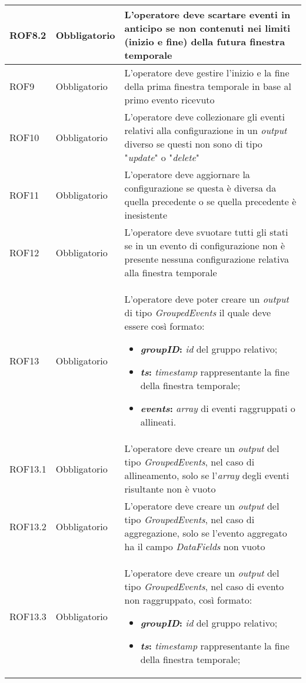 {\begin{longtable}{L{3cm} L{3cm} L{7.5cm}}
\hline
ROF8.2 & Obbligatorio & L'operatore deve scartare eventi in anticipo se non contenuti nei limiti (inizio e fine) della futura finestra temporale\\
\hline
ROF9 & Obbligatorio & L'operatore deve gestire l'inizio e la fine della prima finestra temporale in base al primo evento ricevuto\\
\hline
ROF10 & Obbligatorio & L'operatore deve collezionare gli eventi relativi alla configurazione in un \textit{output} diverso se questi non sono di tipo "\textit{update}" o "\textit{delete}"\\
\hline
ROF11 & Obbligatorio & L'operatore deve aggiornare la configurazione se questa è diversa da quella precedente o se quella precedente è inesistente\\
\hline
ROF12 & Obbligatorio & L'operatore deve svuotare tutti gli stati se in un evento di configurazione non è presente nessuna configurazione relativa alla finestra temporale\\
\hline
ROF13 & Obbligatorio & L'operatore deve poter creare un \textit{output} di tipo \textit{GroupedEvents} il quale deve essere così formato:
\begin{itemize}
	\item{\textbf{\textit{groupID}:} \textit{id} del gruppo relativo;}
	\item{\textbf{\textit{ts}:} \textit{\gls{timestamp}} rappresentante la fine della finestra temporale;}
	\item{\textbf{\textit{events}:} \textit{array} di eventi raggruppati o allineati.}
\end{itemize}\\
\hline
ROF13.1 & Obbligatorio & L'operatore deve creare un \textit{output} del tipo \textit{GroupedEvents}, nel caso di allineamento, solo se l'\textit{array} degli eventi risultante non è vuoto\\
\hline
ROF13.2 & Obbligatorio & L'operatore deve creare un \textit{output} del tipo \textit{GroupedEvents}, nel caso di aggregazione, solo se l'evento aggregato ha il campo \textit{DataFields} non vuoto\\
\hline
ROF13.3 & Obbligatorio & L'operatore deve creare un \textit{output} del tipo \textit{GroupedEvents}, nel caso di evento non raggruppato, così formato:
\begin{itemize}
	\item{\textbf{\textit{groupID}:} \textit{id} del gruppo relativo;}
	\item{\textbf{\textit{ts}:} \textit{\gls{timestamp}} rappresentante la fine della finestra temporale;}

\end{itemize}
\end{longtable}}
